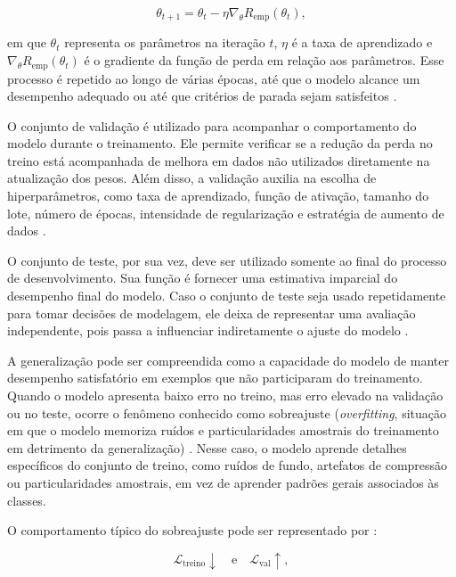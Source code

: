 \documentclass[
    12pt,
    openright,
    oneside,
    a4paper,
    english,
    brazil
]{abntex2}
\begin{document}
\begin{equation}
\label{eq:gradiente_descendente}
\theta_{t+1}
=
\theta_t
-
\eta
\nabla_{\theta}
R_{\text{emp}}(\theta_t),
\end{equation}

em que \(\theta_t\) representa os parâmetros na iteração \(t\), \(\eta\) é a taxa de aprendizado e \(\nabla_{\theta}R_{\text{emp}}(\theta_t)\) é o gradiente da função de perda em relação aos parâmetros. Esse processo é repetido ao longo de várias épocas, até que o modelo alcance um desempenho adequado ou até que critérios de parada sejam satisfeitos \cite{goodfellow2016deep,deisenroth2020mathematics}.

O conjunto de validação é utilizado para acompanhar o comportamento do modelo durante o treinamento. Ele permite verificar se a redução da perda no treino está acompanhada de melhora em dados não utilizados diretamente na atualização dos pesos. Além disso, a validação auxilia na escolha de hiperparâmetros, como taxa de aprendizado, função de ativação, tamanho do lote, número de épocas, intensidade de regularização e estratégia de aumento de dados \cite{goodfellow2016deep,deisenroth2020mathematics}.

O conjunto de teste, por sua vez, deve ser utilizado somente ao final do processo de desenvolvimento. Sua função é fornecer uma estimativa imparcial do desempenho final do modelo. Caso o conjunto de teste seja usado repetidamente para tomar decisões de modelagem, ele deixa de representar uma avaliação independente, pois passa a influenciar indiretamente o ajuste do modelo \cite{deisenroth2020mathematics,goodfellow2016deep}.

A generalização pode ser compreendida como a capacidade do modelo de manter desempenho satisfatório em exemplos que não participaram do treinamento. Quando o modelo apresenta baixo erro no treino, mas erro elevado na validação ou no teste, ocorre o fenômeno conhecido como sobreajuste (\textit{overfitting}, situação em que o modelo memoriza ruídos e particularidades amostrais do treinamento em detrimento da generalização) \cite{goodfellow2016deep,deisenroth2020mathematics}. Nesse caso, o modelo aprende detalhes específicos do conjunto de treino, como ruídos de fundo, artefatos de compressão ou particularidades amostrais, em vez de aprender padrões gerais associados às classes.

O comportamento típico do sobreajuste pode ser representado por \cite{goodfellow2016deep}:

\begin{equation}
\label{eq:criterio_sobreajuste}
\mathcal{L}_{\text{treino}} \downarrow
\quad \text{e} \quad
\mathcal{L}_{\text{val}} \uparrow,
\end{equation}
\end{document}
